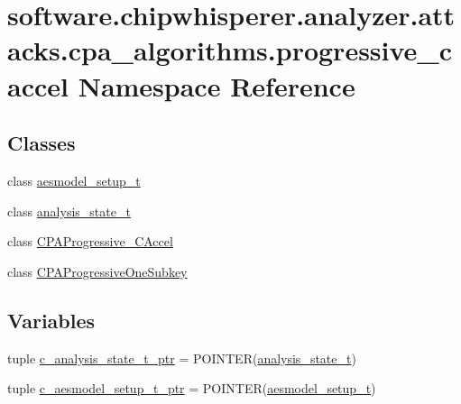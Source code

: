 \hypertarget{namespacesoftware_1_1chipwhisperer_1_1analyzer_1_1attacks_1_1cpa__algorithms_1_1progressive__caccel}{}\section{software.\+chipwhisperer.\+analyzer.\+attacks.\+cpa\+\_\+algorithms.\+progressive\+\_\+caccel Namespace Reference}
\label{namespacesoftware_1_1chipwhisperer_1_1analyzer_1_1attacks_1_1cpa__algorithms_1_1progressive__caccel}
\subsection*{Classes}
\begin{DoxyCompactItemize}
\item 
class \hyperlink{classsoftware_1_1chipwhisperer_1_1analyzer_1_1attacks_1_1cpa__algorithms_1_1progressive__caccel_1_1aesmodel__setup__t}{aesmodel\+\_\+setup\+\_\+t}
\item 
class \hyperlink{classsoftware_1_1chipwhisperer_1_1analyzer_1_1attacks_1_1cpa__algorithms_1_1progressive__caccel_1_1analysis__state__t}{analysis\+\_\+state\+\_\+t}
\item 
class \hyperlink{classsoftware_1_1chipwhisperer_1_1analyzer_1_1attacks_1_1cpa__algorithms_1_1progressive__caccel_1_1CPAProgressive__CAccel}{C\+P\+A\+Progressive\+\_\+\+C\+Accel}
\item 
class \hyperlink{classsoftware_1_1chipwhisperer_1_1analyzer_1_1attacks_1_1cpa__algorithms_1_1progressive__caccel_1_1CPAProgressiveOneSubkey}{C\+P\+A\+Progressive\+One\+Subkey}
\end{DoxyCompactItemize}
\subsection*{Variables}
\begin{DoxyCompactItemize}
\item 
tuple \hyperlink{namespacesoftware_1_1chipwhisperer_1_1analyzer_1_1attacks_1_1cpa__algorithms_1_1progressive__caccel_aabd08257306b5406199bb1f33e87122e}{c\+\_\+analysis\+\_\+state\+\_\+t\+\_\+ptr} = P\+O\+I\+N\+T\+E\+R(\hyperlink{classsoftware_1_1chipwhisperer_1_1analyzer_1_1attacks_1_1cpa__algorithms_1_1progressive__caccel_1_1analysis__state__t}{analysis\+\_\+state\+\_\+t})
\item 
tuple \hyperlink{namespacesoftware_1_1chipwhisperer_1_1analyzer_1_1attacks_1_1cpa__algorithms_1_1progressive__caccel_a5ac392b22526a6a9379e8b8be3d11347}{c\+\_\+aesmodel\+\_\+setup\+\_\+t\+\_\+ptr} = P\+O\+I\+N\+T\+E\+R(\hyperlink{classsoftware_1_1chipwhisperer_1_1analyzer_1_1attacks_1_1cpa__algorithms_1_1progressive__caccel_1_1aesmodel__setup__t}{aesmodel\+\_\+setup\+\_\+t})
\end{DoxyCompactItemize}


